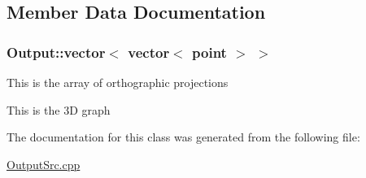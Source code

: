\subsection{Member Data Documentation}
\subsubsection[{\texorpdfstring{vector$<$ vector$<$ point $>$ $>$}{vector< vector< point > >}}]{\setlength{\rightskip}{0pt plus 5cm}Output\+::vector$<$ vector$<$ {\bf point} $>$ $>$}\hypertarget{classOutput_a108ca6c08cfc8a442fac5f1dc864a481}{}\label{classOutput_a108ca6c08cfc8a442fac5f1dc864a481}
This is the array of orthographic projections

This is the 3D graph 

The documentation for this class was generated from the following file\+:\begin{DoxyCompactItemize}
\item 
\hyperlink{OutputSrc_8cpp}{Output\+Src.\+cpp}\end{DoxyCompactItemize}

